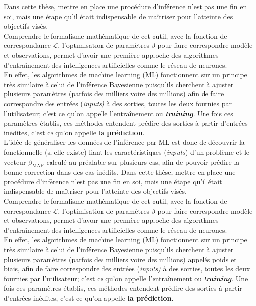 \documentclass[a4paper,12pt]{article}
\newcommand{\bmap}{\beta_{\text{MAP}}}
\numberwithin{equation}{section} %
\begin{document}
\noindent Dans cette thèse, mettre en place une procédure d'inférence n'est pas une fin en soi, mais une étape qu'il était indispensable de maîtriser pour l'atteinte des objectifs visés.\\
Comprendre le formalisme mathématique de cet outil, avec la fonction de correspondance $\mathcal{L}$, l'optimisation de paramètres $\beta$ pour faire correspondre modèle et observations, permet d'avoir une première approche des algorithmes d'entraînement des intelligences artificielles comme le réseau de neurones.\\
En effet, les algorithmes de machine learning (ML) fonctionnent sur un principe très similaire à celui de l'inférence Bayesienne puisqu'ils cherchent à ajuster plusieurs paramètres (parfois des milliers voire des millions) afin de faire correspondre des entrées (\textit{inputs)} à des sorties, toutes les deux fournies par l'utilisateur; c'est ce qu'on appelle l'entraînement ou \textbf{\textit{training}}. Une fois ces paramètres établis, ces méthodes entendent prédire des sorties à partir d'entrées inédites, c'est ce qu'on appelle \textbf{la prédiction}.\\

\noindent L'idée de généraliser les données de l'inférence par ML est donc de découvrir la fonctionnelle (si elle existe) liant les caractéristiques (\textit{inputs}) d'un problème et le vecteur $\bmap$ calculé au préalable sur plusieurs cas, afin de pouvoir prédire la bonne correction dans des cas inédits. Dans cette thèse, mettre en place une procédure d'inférence n'est pas une fin en soi, mais une étape qu'il était indispensable de maîtriser pour l'atteinte des objectifs visés.\\
Comprendre le formalisme mathématique de cet outil, avec la fonction de correspondance $\mathcal{L}$, l'optimisation de paramètres $\beta$ pour faire correspondre modèle et observations, permet d'avoir une première approche des algorithmes d'entraînement des intelligences artificielles comme le réseau de neurones.\\
En effet, les algorithmes de machine learning (ML) fonctionnent sur un principe très similaire à celui de l'inférence Bayesienne puisqu'ils cherchent à ajuster plusieurs paramètres (parfois des milliers voire des millions) appelés poids et biais, afin de faire correspondre des entrées (\textit{inputs)} à des sorties, toutes les deux fournies par l'utilisateur; c'est ce qu'on appelle l'entraînement ou \textbf{\textit{training}}. Une fois ces paramètres établis, ces méthodes entendent prédire des sorties à partir d'entrées inédites, c'est ce qu'on appelle \textbf{la prédiction}.\\
\end{document}
